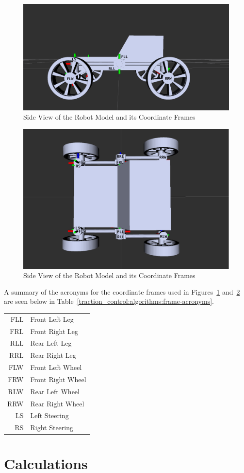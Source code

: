\begin{figure}[H]
	\centering
	\includegraphics[width=.9\textwidth]{sections/algorithms/images/srr_side.png}
	\caption{Side View of the Robot Model and its Coordinate Frames}
	\label{traction_control:algorithms:coordinates-side}
\end{figure}
 
\begin{figure}[H]
	\centering
	\includegraphics[width=.9\textwidth]{sections/algorithms/images/srr_top.png}
	\caption{Side View of the Robot Model and its Coordinate Frames}
	\label{traction_control:algorithms:coordinates-top}
\end{figure}
 
A summary of the acronyms for the coordinate frames used in Figures~\ref{traction_control:algorithms:coordinates-side} and~\ref{traction_control:algorithms:coordinates-top} are seen below in Table~\ref{traction_control:algorithms:frame-acronyms}.
\begin{center}\label{traction_control:algorithms:frame-acronyms}
	\begin{tabular}{rl}
		FLL & Front Left Leg \\
		FRL & Front Right Leg \\
		RLL & Rear Left Leg \\
		RRL & Rear Right Leg \\
		FLW & Front Left Wheel \\
		FRW & Front Right Wheel \\
		RLW & Rear Left Wheel \\
		RRW & Rear Right Wheel \\
		LS  & Left Steering \\
		RS  & Right Steering
	\end{tabular}
\end{center}

\section{Calculations}
